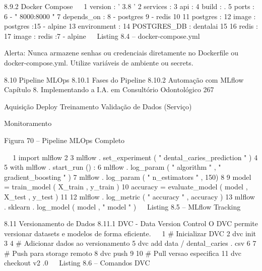    8.9.2      Docker Compose
                                                                                                
 1 version : ' 3.8 '
 2 services :
 3   api :
 4     build : .
 5     ports :
 6         - " 8000:8000 "
 7     depends_on :
 8         - postgres
 9         - redis
10
11   postgres :
12     image : postgres :15 - alpine
13     environment :
14         POSTGRES_DB : dentalai
15
16   redis :
17     image : redis :7 - alpine
                                                                                                
                                    Listing 8.4 – docker-compose.yml


      Alerta: Nunca armazene senhas ou credenciais diretamente no Dockerfile ou
      docker-compose.yml. Utilize variáveis de ambiente ou secrets.


   8.10        Pipeline MLOps
   8.10.1       Fases do Pipeline
   8.10.2       Automação com MLflow
  Capítulo 8. Implementando a I.A. em Consultório Odontológico                      267


      Aquisição                                                          Deploy
                              Treinamento                Validação
      de Dados                                                          (Serviço)



                                                                      Monitoramento

                             Figura 70 – Pipeline MLOps Completo

                                                                                         
 1 import mlflow
 2
 3 mlflow . set_experiment ( " dental_caries_prediction " )
 4
 5 with mlflow . start_run () :
 6     mlflow . log_param ( " algorithm " , " gradient_boosting " )
 7     mlflow . log_param ( " n_estimators " , 150)
 8
 9     model = train_model ( X_train , y_train )
10     accuracy = evaluate_model ( model , X_test , y_test )
11
12     mlflow . log_metric ( " accuracy " , accuracy )
13     mlflow . sklearn . log_model ( model , " model " )
                                                                                         
                                  Listing 8.5 – MLflow Tracking



  8.11       Versionamento de Dados
  8.11.1      DVC - Data Version Control
  O DVC permite versionar datasets e modelos de forma eficiente.
                                                                                         
 1 # Inicializar DVC
 2 dvc init
 3
 4 # Adicionar dados ao versionamento
 5 dvc add data / dental_caries . csv
 6
 7 # Push para storage remoto
 8 dvc push
 9
10 # Pull versao especifica
11 dvc checkout v2 .0
                                                                                         
                                  Listing 8.6 – Comandos DVC


